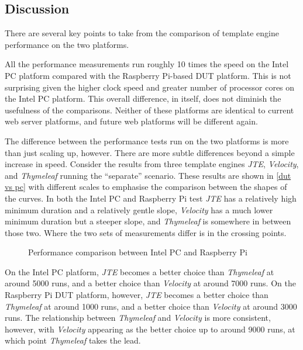 \subsection{Discussion}
\label{pc dut discussion}
There are several key points to take from the comparison of \gls{template engine} performance on the two platforms.

All the performance measurements run roughly 10 times the speed on the Intel PC platform compared with the Raspberry Pi-based DUT platform. This is not surprising given the higher clock speed and greater number of processor cores on the Intel PC platform. This overall difference, in itself, does not diminish the usefulness of the comparisons. Neither of these platforms are identical to current web server platforms, and future web platforms will be different again. 

The difference between the performance tests run on the two platforms is more than just scaling up, however. There are more subtle differences beyond a simple increase in speed. Consider the results from three template engines \emph{JTE}, \emph{Velocity}, and \emph{Thymeleaf} running the \enquote{separate} scenario. These results are shown in \autoref{dut vs pc} with different scales to emphasise the comparison between the shapes of the curves. In both the Intel PC and Raspberry Pi test \emph{JTE} has a relatively high minimum duration and a relatively gentle slope, \emph{Velocity} has a much lower minimum duration but a steeper slope, and \emph{Thymeleaf} is somewhere in between those two. Where the two sets of measurements differ is in the crossing points.

\begin{figure}[ht!]
\centering

\caption{\label{dut vs pc}Performance comparison between Intel PC and Raspberry Pi}
\end{figure}

On the Intel PC platform, \emph{JTE} becomes a better choice than \emph{Thymeleaf} at around 5000 runs, and a better choice than \emph{Velocity} at around 7000 runs. On the Raspberry Pi DUT platform, however, \emph{JTE} becomes a better choice than \emph{Thymeleaf} at around 1000 runs, and a better choice than \emph{Velocity} at around 3000 runs. The relationship between \emph{Thymeleaf} and \emph{Velocity} is more consistent, however, with  \emph{Velocity} appearing as the better choice up to around 9000 runs, at which point \emph{Thymeleaf} takes the lead.


